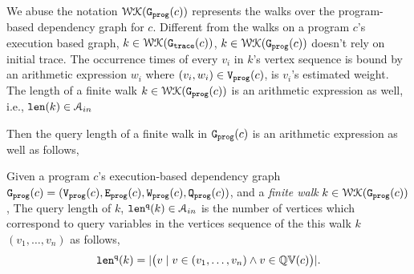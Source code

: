   We abuse the notation $\mathcal{WK}(\mathtt{{G_{prog}}}(c))$ represents the walks over the program-based dependency graph for $c$.
Different from the walks on a program $c$'s execution based graph,
 $k \in \mathcal{WK}(\mathtt{{G_{trace}}}(c))$, 
$k \in \mathcal{WK}(\mathtt{{G_{prog}}}(c))$ doesn't rely on initial trace.
The occurrence times of every $v_i $ in $k$'s vertex sequence is bound by 
an arithmetic expression $w_i$ where $(v_i, w_i) \in \mathtt{{V_{prog}}}(c)$, is $v_i$'s estimated weight. 
 The length of a finite walk $k \in \mathcal{WK}(\mathtt{{G_{prog}}}(c))$ is an arithmetic expression
 as well, i.e., $\mathtt{len}(k) \in \mathcal{A}_{in}$

 Then the query length of a finite walk in  $\mathtt{{G_{prog}}}(c)$ is an arithmetic expression as well as follows,
\begin{defn}
  \label{def:qlen}
  Given 
  a program $c$'s execution-based dependency graph 
  $\mathtt{{G_{prog}}}({c}) = (\mathtt{{V_{prog}}}(c), \mathtt{{E_{prog}}}(c), \mathtt{{W_{prog}}}(c), \mathtt{{Q_{prog}}}(c))$, 
   and a \emph{finite walk} $k \in \mathcal{WK}(\mathtt{{G_{prog}}}(c))$,
  The query length of $k$, $\mathtt{len}^{\tt q}(k) \in \mathcal{A}_{in}$ 
  is the number of vertices which correspond to query variables in the vertices sequence of the this walk $k$
  $(v_1, \ldots, v_{n})$ as follows, 
  \[
    \mathtt{len}^{\tt q}(k) = |\big( v \mid v \in (v_1, \ldots, v_{n}) \land v \in \mathbb{QV}(c) \big)|.
  \]
  \end{defn}
